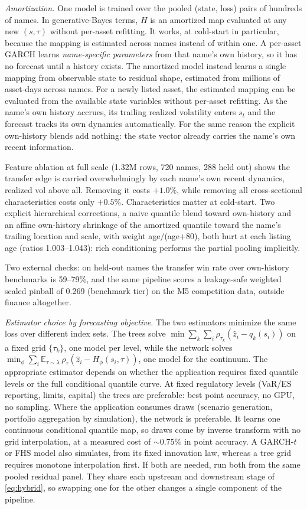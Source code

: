 \documentclass[11pt]{article}
\theoremstyle{remark}
\begin{document}
\emph{Amortization.} One model is trained over the pooled (state, loss)
pairs of hundreds of names. In generative-Bayes terms, $H$ is an
amortized map evaluated at any new $(s,\tau)$ without per-asset
refitting. It works, at cold-start in particular, because the mapping is estimated across names instead of within one. A per-asset
GARCH learns \emph{name-specific parameters} from that name's own
history, so it has no forecast until a history exists. The amortized model instead
learns a single mapping from observable state to residual shape,
estimated from millions of asset-days across names. For a newly listed asset, the estimated mapping can be evaluated from the available state variables without per-asset refitting. As
the name's own history accrues, its trailing realized volatility enters
$s_t$ and the forecast tracks its own dynamics automatically. For the same reason the explicit own-history blends add nothing: the state vector already carries the name's own recent information.

Feature ablation at full scale (1.32M rows, 720 names, 288 held out) shows the transfer edge is carried overwhelmingly by each name's own recent dynamics, realized vol above all. Removing it costs $+1.0\%$, while removing all cross-sectional characteristics costs only $+0.5\%$. Characteristics matter at cold-start. Two explicit hierarchical corrections, a naive quantile blend toward
own-history and an affine own-history shrinkage of the amortized quantile toward the name's trailing location and scale, with weight age$/$(age$+80$), both
hurt at each listing age (ratios 1.003--1.043): rich
conditioning performs the partial pooling implicitly.

Two external checks: on held-out names the
transfer win rate over own-history benchmarks is 59--79\%, and the same
pipeline scores a leakage-safe weighted scaled pinball of 0.269
(benchmark tier) on the M5 competition data, outside finance
altogether.

\noindent\emph{Estimator choice by forecasting objective.} The two estimators minimize the same loss over different index sets. The trees solve $\min \sum_{k}\sum_{i}\rho_{\tau_k}(\widehat{z}_i - q_k(s_i))$ on a fixed grid $\{\tau_k\}$, one model per level, while the network solves $\min_\phi \sum_i \mathbb{E}_{\tau\sim\lambda}\, \rho_\tau(\widehat{z}_i - H_\phi(s_i,\tau))$, one model for the continuum. The appropriate estimator depends on whether the application requires fixed quantile levels or the full conditional quantile curve.
At fixed regulatory levels (VaR/ES
reporting, limits, capital) the trees are preferable: best point accuracy, no
GPU, no sampling. Where the application consumes draws (scenario generation, portfolio aggregation by simulation), the network is preferable. It learns one continuous conditional quantile map, so draws come by inverse transform with no grid interpolation, at a measured cost of $\sim$0.75\% in point accuracy. A GARCH-$t$ or FHS model also simulates, from its fixed innovation law, whereas a tree grid requires monotone interpolation first. If both are needed,
run both from the same pooled residual panel. They share each upstream
and downstream stage of \eqref{eq:hybrid}, so swapping one for the
other changes a single component of the pipeline.
\end{document}
